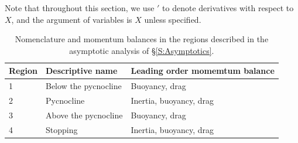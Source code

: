 \documentclass[openacc]{rsproca_new}%
\begin{document}
Note that throughout this section, we use $'$ to denote derivatives with respect to $X$, and the argument of variables is $X$ unless specified.

\begin{table}[h!]
\caption{Nomenclature and momentum balances in the regions described in the asymptotic analysis of \S\ref{S:Asymptotics}.}
\label{T:Balances}
\begin{center}
\begin{tabular}{lll}
  Region  & Descriptive name & Leading order momemtum balance    \\ \hline
   1  & Below the pycnocline & Buoyancy, drag \\
   2  & Pycnocline & Inertia, buoyancy, drag \\
   3  & Above the pycnocline & Buoyancy, drag \\
   4  & Stopping & Inertia,  buoyancy, drag
\end{tabular}
\end{center}
\vspace{-4pt}
\end{table}
\end{document}
